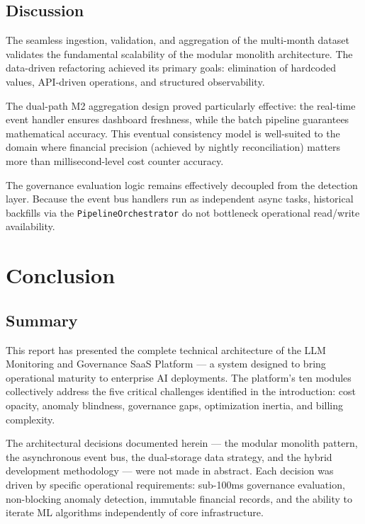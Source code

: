\documentclass[12pt,a4paper,twoside]{report}
\begin{document}
\section{Discussion}

The seamless ingestion, validation, and aggregation of the multi-month dataset validates the fundamental scalability of the modular monolith architecture. The data-driven refactoring achieved its primary goals: elimination of hardcoded values, API-driven operations, and structured observability.

The dual-path M2 aggregation design proved particularly effective: the real-time event handler ensures dashboard freshness, while the batch pipeline guarantees mathematical accuracy. This eventual consistency model is well-suited to the domain where financial precision (achieved by nightly reconciliation) matters more than millisecond-level cost counter accuracy.

The governance evaluation logic remains effectively decoupled from the detection layer. Because the event bus handlers run as independent async tasks, historical backfills via the \texttt{PipelineOrchestrator} do not bottleneck operational read/write availability.


\chapter{Conclusion}

\section{Summary}

This report has presented the complete technical architecture of the LLM Monitoring and Governance SaaS Platform — a system designed to bring operational maturity to enterprise AI deployments. The platform's ten modules collectively address the five critical challenges identified in the introduction: cost opacity, anomaly blindness, governance gaps, optimization inertia, and billing complexity.

The architectural decisions documented herein — the modular monolith pattern, the asynchronous event bus, the dual-storage data strategy, and the hybrid development methodology — were not made in abstract. Each decision was driven by specific operational requirements: sub-100ms governance evaluation, non-blocking anomaly detection, immutable financial records, and the ability to iterate ML algorithms independently of core infrastructure.
\end{document}
